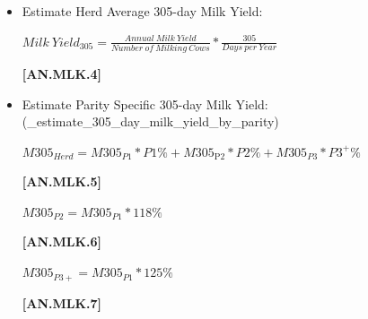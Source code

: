 \documentclass{article}
\begin{document}
\begin{refsection}
\begin{enumerate}
        \begin{itemize}
            \item Estimate Herd Average 305-day Milk Yield:
            \vspace{0.5cm}
            
            \begin{center}
                \(Milk\ Yield_{305} = \frac{Annual\ Milk\ Yield}{Number\ of\ Milking\ Cows} * \frac{305}{Days\ per\ Year}\)
            \end{center}
            \vspace{0.5cm}
            
            {\raggedleft \textbf{[AN.MLK.4]}\par}
            \vspace{0.5cm}

            \item Estimate Parity Specific 305-day Milk Yield: (\_estimate\_305\_day\_milk\_yield\_by\_parity)
            \vspace{0.5cm}
            
            \begin{center}
                \(M305_{Herd} = M305_{P1} * P1\% + M305_{\text{P2}} * P2\% + M305_{P3} * P3^+\%\)
            \end{center}
            \vspace{0.5cm}
            
            {\raggedleft \textbf{[AN.MLK.5]}\par}
            \vspace{0.5cm}
            
            \begin{center}
                \(M305_{P2} = M305_{P1} * 118\%\)
            \end{center}
            \vspace{0.5cm}
            
            {\raggedleft \textbf{[AN.MLK.6]}\par}
            \vspace{0.5cm}
            
            \begin{center}
                \(M305_{P3+} = M305_{P1} * 125\%\)
            \end{center}
            \vspace{0.5cm}
            
            {\raggedleft \textbf{[AN.MLK.7]}\par}
            \vspace{0.5cm}
            

\end{itemize}
\end{enumerate}
\end{refsection}
\end{document}
